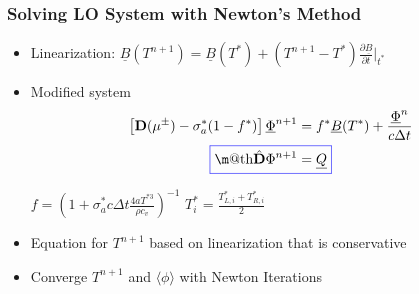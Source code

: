 \documentclass[xcolor=dvipsnames,hyperref={pdfpagelabels=false},unknownkeysallowed]{beamer}
\makeatletter
\newcommand*{\boxedcolor}{blue}
\renewcommand{\boxed}[1]{\textcolor{\boxedcolor}{%
  \fbox{\normalcolor\m@th$\displaystyle#1$}}}
\renewcommand{\u}[1]{\underline{#1}}
\newlength{\wideitemsep}
\let\olditem\item
\renewcommand{\item}{\setlength{\itemsep}{\wideitemsep}\olditem}
\newcommand{\pderiv}[2]{\frac{\partial #1}{\partial #2}}
\newcommand{\B}[1]{\ensuremath{\mathbf{#1}}}
\newcommand{\mom}[1]{\langle #1 \rangle}
\makeatother
\begin{document}
\begin{frame}
    \frametitle{Solving LO System with Newton's Method}
    \begin{block}{}
    \begin{itemize}
        \item Linearization: $\displaystyle \u B(T^{n+1}) = \u B(T^*) + \left(T^{n+1} -
                T^*\right) \pderiv{\u B}{t}\bigg|_{t^*}$
        \vspace{-0.15in}
        \item Modified system
            \begin{gather*}
                \displaystyle \left[\B  D(\mu^\pm) - \sigma_a^*(1-f^*) \right]\underline
                \Phi^{n+1}  = f^* \u B(T^*) + \frac{ \underline \Phi^n}{c\Delta t} \\
                \boxed{\hat{ \B  D }\Phi^{n+1} = \underline Q}
            \end{gather*}
        \vspace{-0.07in}
        \begin{center}
         $\displaystyle f = \left( 1 + \sigma_a^*c \Delta t \frac{4aT^{*3}}{\rho
            c_v} \right)^{-1}$  \hspace{0.3in}
         $\displaystyle T_i^* = \frac{T^{*}_{L,i}+T^{*}_{R,i}}{2}$
     \end{center}
 \item Equation for $T^{n+1}$ based on linearization that is conservative
 \item Converge $T^{n+1}$ and $\mom{\phi}$ with Newton Iterations
 \end{itemize}
 \end{block}
\end{frame}
\end{document}
